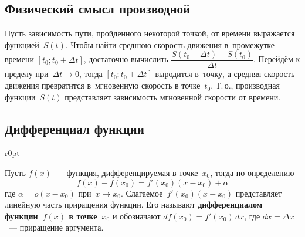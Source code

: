 \subsection{Физический смысл производной}
Пусть зависимость пути, пройденного некоторой точкой, от времени выражается функцией~$S(t)$.
Чтобы найти среднюю скорость движения в~промежутке времени $[t_0; t_0 + \Delta t]$, достаточно вычислить $\dfrac{S(t_0 + \Delta t) - S(t_0)}{\Delta t}$.
Перейдём к пределу при~$\Delta t \to 0$, тогда $[t_0; t_0 + \Delta t]$ выродится в~точку, а средняя скорость движения превратится в~мгновенную скорость в точке~$t_0$.
Т.\,о., производная функции~$S(t)$ представляет зависимость мгновенной скорости от времени.

\subsection{Дифференциал функции}
\begin{wrapfigure}{r}{0pt}
\noindent
{}
\end{wrapfigure}

  Пусть $f(x)$~--- функция, дифференцируемая в точке~$x_0$, тогда по определению
\begin{equation*}
f(x) - f(x_0) = f'(x_0)(x - x_0) + \alpha
\end{equation*}
где $\alpha = o(x - x_0)$ при~$x \to x_0$.
Слагаемое~$f'(x_0)(x - x_0)$ представляет линейную часть приращения функции.
Его называют \textbf{дифференциалом функции~$f(x)$ в точке~$x_0$} и обозначают $df(x_0) = f'(x_0)\,dx$, где $dx = \Delta x$~--- приращение аргумента.

